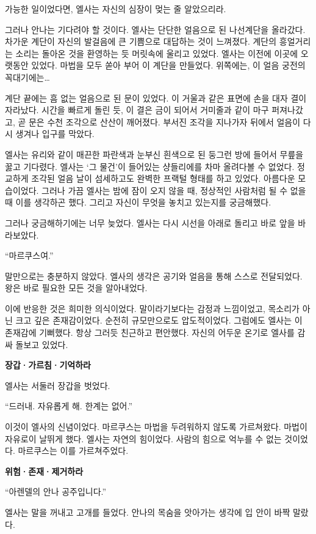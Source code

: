 가능한 일이었다면, 엘사는 자신의 심장이 멎는 줄 알았으리라.

그러나 안나는 기다려야 할 것이다. 엘사는 단단한 얼음으로 된 나선계단을 올라갔다. 차가운 계단이 자신의 발걸음에 큰 기쁨으로 대답하는 것이 느껴졌다. 계단의 흥얼거리는 소리는 돌아온 것을 환영하는 듯 머릿속에 울리고 있었다. 엘사는 이전에 이곳에 오랫동안 있었다. 마법을 모두 쏟아 부어 이 계단을 만들었다. 위쪽에는, 이 얼음 궁전의 꼭대기에는\ldots

계단 끝에는 흠 없는 얼음으로 된 문이 있었다. 이 거울과 같은 표면에 손을 대자 결이 자라났다. 시간을 빠르게 돌린 듯, 이 결은 금이 되어서 거미줄과 같이 마구 퍼져나갔고, 곧 문은 수천 조각으로 산산이 깨어졌다. 부서진 조각을 지나가자 뒤에서 얼음이 다시 생겨나 입구를 막았다.

엘사는 유리와 같이 매끈한 파란색과 눈부신 흰색으로 된 둥그런 방에 들어서 무릎을 꿇고 기다렸다. 엘사는 `그 물건'이 들어있는 샹들리에를 차마 올려다볼 수 없었다. 정교하게 조각된 얼음 날이 섬세하고도 완벽한 프랙털 형태를 하고 있었다. 아름다운 모습이었다. 그러나 가끔 엘사는 밤에 잠이 오지 않을 때, 정상적인 사람처럼 될 수 없을때 이를 생각하곤 했다. 그리고 자신이 무엇을 놓치고 있는지를 궁금해했다.

그러나 궁금해하기에는 너무 늦었다. 엘사는 다시 시선을 아래로 돌리고 바로 앞을 바라보았다.

``마르쿠스여.''

말만으로는 충분하지 않았다. 엘사의 생각은 공기와 얼음을 통해 스스로 전달되었다. 왕은 바로 필요한 모든 것을 알아내었다.

이에 반응한 것은 희미한 의식이었다. 말이라기보다는 감정과 느낌이었고, 목소리가 아닌 크고 깊은 존재감이었다. 순전히 규모만으로도 압도적이었다. 그럼에도 엘사는 이 존재감에 기뻐했다. 항상 그러듯 친근하고 편안했다. 자신의 어두운 온기로 엘사를 감싸 돌보고 있었다.

\textbf{장갑·가르침·기억하라}

엘사는 서둘러 장갑을 벗었다.

``드러내. 자유롭게 해. 한계는 없어.''

이것이 엘사의 신념이었다. 마르쿠스는 마법을 두려워하지 않도록 가르쳐왔다. 마법이 자유로이 날뛰게 했다. 엘사는 자연의 힘이었다. 사람의 힘으로 억누를 수 없는 것이었다. 마르쿠스는 이를 가르쳐주었다.

\textbf{위험·존재·제거하라}

``아렌델의 안나 공주입니다.''

엘사는 말을 꺼내고 고개를 들었다. 안나의 목숨을 앗아가는 생각에 입 안이 바짝 말랐다.

